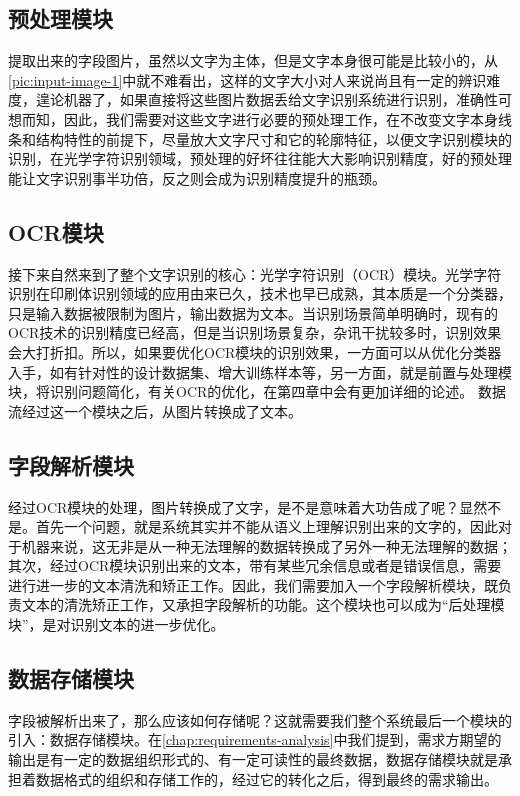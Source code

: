 \subsection{预处理模块}
提取出来的字段图片，虽然以文字为主体，但是文字本身很可能是比较小的，从\autoref{pic:input-image-1}中就不难看出，这样的文字大小对人来说尚且有一定的辨识难度，遑论机器了，如果直接将这些图片数据丢给文字识别系统进行识别，准确性可想而知，因此，我们需要对这些文字进行必要的预处理工作，在不改变文字本身线条和结构特性的前提下，尽量放大文字尺寸和它的轮廓特征，以便文字识别模块的识别，在光学字符识别领域，预处理的好坏往往能大大影响识别精度，好的预处理能让文字识别事半功倍，反之则会成为识别精度提升的瓶颈。

\subsection{OCR模块}
接下来自然来到了整个文字识别的核心：光学字符识别（OCR）模块。光学字符识别在印刷体识别领域的应用由来已久\citep{impedovo1991optical}，技术也早已成熟，其本质是一个分类器，只是输入数据被限制为图片，输出数据为文本。当识别场景简单明确时，现有的OCR技术的识别精度已经高，但是当识别场景复杂，杂讯干扰较多时，识别效果会大打折扣。所以，如果要优化OCR模块的识别效果，一方面可以从优化分类器入手，如有针对性的设计数据集、增大训练样本等，另一方面，就是前置与处理模块，将识别问题简化，有关OCR的优化，在第四章中会有更加详细的论述。
数据流经过这一个模块之后，从图片转换成了文本。

\subsection{字段解析模块}
经过OCR模块的处理，图片转换成了文字，是不是意味着大功告成了呢？显然不是。首先一个问题，就是系统其实并不能从语义上理解识别出来的文字的，因此对于机器来说，这无非是从一种无法理解的数据转换成了另外一种无法理解的数据；其次，经过OCR模块识别出来的文本，带有某些冗余信息或者是错误信息，需要进行进一步的文本清洗和矫正工作。因此，我们需要加入一个字段解析模块，既负责文本的清洗矫正工作，又承担字段解析的功能。这个模块也可以成为“后处理模块”，是对识别文本的进一步优化。

\subsection{数据存储模块}
字段被解析出来了，那么应该如何存储呢？这就需要我们整个系统最后一个模块的引入：数据存储模块。在\autoref{chap:requirements-analysis}中我们提到，需求方期望的输出是有一定的数据组织形式的、有一定可读性的最终数据，数据存储模块就是承担着数据格式的组织和存储工作的，经过它的转化之后，得到最终的需求输出。

